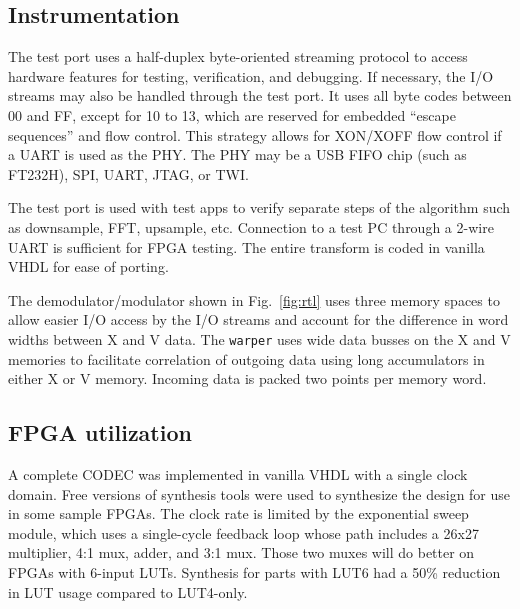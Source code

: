 \subsection{Instrumentation}

The test port uses a half-duplex byte-oriented streaming protocol to access
hardware features for testing, verification, and debugging.
If necessary, the I/O streams may also be handled through the test port.
It uses all byte codes between 00 and FF, except for 10 to 13,
which are reserved for embedded ``escape sequences'' and flow control.
This strategy allows for XON/XOFF flow control if a UART is used as the PHY.
The PHY may be a USB FIFO chip (such as FT232H), SPI, UART, JTAG, or TWI.

The test port is used with test apps to verify separate steps of the
algorithm such as downsample, FFT, upsample, etc.
Connection to a test PC through a 2-wire UART is sufficient for FPGA testing.
The entire transform is coded in vanilla VHDL for ease of porting.

The demodulator/modulator shown in Fig.~\ref{fig:rtl} uses three memory
spaces to allow easier I/O access by the I/O streams and account for the
difference in word widths between X and V data.
The \verb|warper| uses wide data busses on the X and V memories to facilitate
correlation of outgoing data using long accumulators in either X or V memory.
Incoming data is packed two points per memory word.

\subsection {FPGA utilization}

A complete CODEC was implemented in vanilla VHDL with a single clock domain.
Free versions of synthesis tools were used to synthesize the design for use in
some sample FPGAs. 
The clock rate is limited by the exponential sweep module, 
which uses a single-cycle feedback loop whose path includes a 26x27 multiplier,
4:1 mux, adder, and 3:1 mux. Those two muxes will do better on FPGAs with 
6-input LUTs. Synthesis for parts with LUT6 had a 50\% reduction in LUT usage
compared to LUT4-only.

